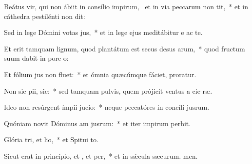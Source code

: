 \item Beátus vir, qui non ábiit in consílio impirum,~\pscross{} et in via peccarum non tit,~* et in cáthedra pestilénti non dit:
\item Sed in lege Dómini votas jus,~* et in lege ejus meditábitur e ac te.
\item Et erit tamquam lignum, quod plantátum est secus desus arum,~* quod fructum suum dabit in pore o:
\item Et fólium jus non fluet:~* et ómnia quæcúmque fáciet, proratur.
\item Non sic pii,  sic:~* sed tamquam pulvis, quem prójicit ventus a cie ræ.
\item Ideo non resúrgent ímpii  jucio:~* neque peccatóres in concíli jusrum.
\item Quóniam novit Dóminus am jusrum:~* et iter impirum perbit.
\item Glória tri, et lio,~* et Spitui to.
\item Sicut erat in princípio, et , et per,~* et in sǽcula sæcurum. men.
